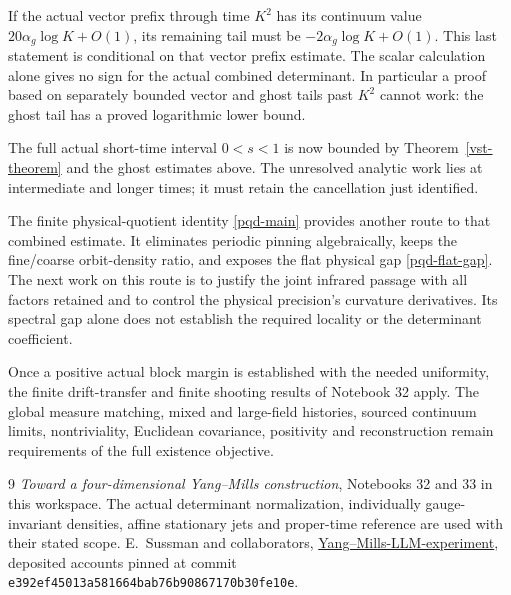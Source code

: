 \documentclass[11pt]{article}
\theoremstyle{remark}
\begin{document}
If the actual vector prefix through time \(K^2\)
has its continuum value \(20\alpha_g\log K+O(1)\),
its remaining tail must be
\(-2\alpha_g\log K+O(1)\).
This last statement is conditional on that vector
prefix estimate. The scalar calculation alone gives
no sign for the actual combined determinant.
In particular a proof based on separately bounded
vector and ghost tails past \(K^2\) cannot work:
the ghost tail has a proved logarithmic lower bound.

The full actual short-time interval \(0<s<1\) is
now bounded by Theorem~\ref{vst-theorem} and the
ghost estimates above. The unresolved analytic work
lies at intermediate and longer times; it must
retain the cancellation just identified.

The finite physical-quotient identity
\eqref{pqd-main} provides another route to that
combined estimate. It eliminates periodic pinning
algebraically, keeps the fine/coarse orbit-density
ratio, and exposes the flat physical gap
\eqref{pqd-flat-gap}. The next work on this route is
to justify the joint infrared passage with all
factors retained and to control the physical
precision's curvature derivatives. Its spectral
gap alone does not establish the required locality
or the determinant coefficient.

Once a positive actual block margin is established
with the needed uniformity, the finite drift-transfer
and finite shooting results of Notebook 32 apply.
The global measure matching, mixed and large-field
histories, sourced continuum limits, nontriviality,
Euclidean covariance, positivity and reconstruction
remain requirements of the full existence objective.

\begin{thebibliography}{9}
\emph{Toward a four-dimensional Yang--Mills construction},
Notebooks 32 and 33 in this workspace.
The actual determinant normalization, individually
gauge-invariant densities, affine stationary jets
and proper-time reference are used with their
stated scope.
E.~Sussman and collaborators,
\href{https://github.com/ethanwsussman/Yang--Mills-LLM-experiment}
{Yang--Mills-LLM-experiment}, deposited accounts pinned at
commit \texttt{e392ef45013a581664bab76b90867170b30fe10e}.
\end{thebibliography}
\end{document}

